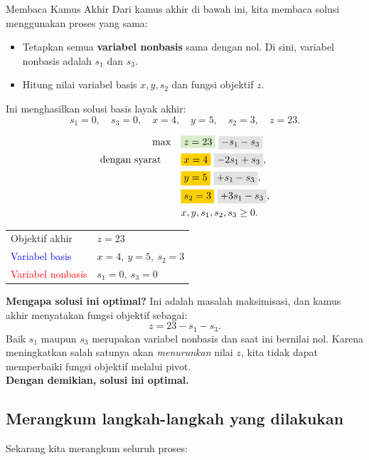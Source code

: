 \begin{remark}{Membaca Kamus Akhir}{}
Dari kamus akhir di bawah ini, kita membaca solusi menggunakan proses yang sama:
\begin{itemize}
    \item Tetapkan semua \textbf{variabel nonbasis} sama dengan nol. Di sini, variabel nonbasis adalah \(s_1\) dan \(s_3\).
    \item Hitung nilai variabel basis \(x, y, s_2\) dan fungsi objektif \(z\).
\end{itemize}

Ini menghasilkan solusi basis layak akhir:
\[
s_1 = 0, \quad s_3 = 0, \quad x = 4, \quad y = 5, \quad s_2 = 3, \quad z = 23.
\]

\[
\begin{aligned}
\max \quad 
& \text{\colorbox{green!20!white}{$z = 23$}} ~ \text{\colorbox{gray!20!white}{$- s_1 - s_3$}} \\
\st \quad 
& \text{\colorbox{yellow}{$x = 4$}} ~ \text{\colorbox{gray!20!white}{$- 2s_1 + s_3$}}, \\
& \text{\colorbox{yellow}{$y = 5$}} ~ \text{\colorbox{gray!20!white}{$+ s_1 - s_3$}}, \\
& \text{\colorbox{yellow}{$s_2 = 3$}} ~ \text{\colorbox{gray!20!white}{$+ 3s_1 - s_3$}}, \\
& x, y, s_1, s_2, s_3 \ge 0.
\end{aligned}
\]

\begin{center}
\small
\begin{tabular}{@{}ll@{}}
\textcolor{green!50!black}{Objektif akhir} & \(z=23\) \\
\textcolor{blue}{Variabel basis} & \(x=4,\ y=5,\ s_2=3\) \\
\textcolor{red}{Variabel nonbasis} & \(s_1=0,\ s_3=0\)
\end{tabular}
\end{center}

\textbf{Mengapa solusi ini optimal?}  
Ini adalah masalah maksimisasi, dan kamus akhir menyatakan fungsi objektif sebagai:
\[
z = 23 - s_1 - s_3.
\]
Baik \(s_1\) maupun \(s_3\) merupakan variabel nonbasis dan saat ini bernilai nol. Karena meningkatkan salah satunya akan \emph{menurunkan} nilai \(z\), kita tidak dapat memperbaiki fungsi objektif melalui pivot.  
\\[0.5em]
\textbf{Dengan demikian, solusi ini optimal.}
\end{remark}

\subsection{Merangkum langkah-langkah yang dilakukan}
Sekarang kita merangkum seluruh proses:

